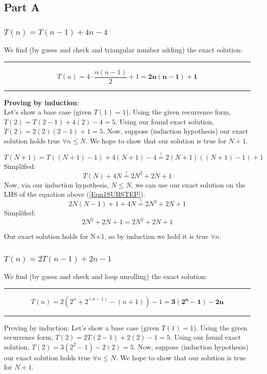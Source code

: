 \documentclass[conference]{styles/acmsiggraph}
\newcommand{\?}{\stackrel{?}{=}}
\begin{document}
\subsection{Part A}
\subsubsection{$T(n)=T(n-1)+4n-4$}
We find (by guess and check and triangular number adding) the exact solution: \\
\rule{\textwidth}{0.4pt}
$$T(n) = 4 \cdot \frac{n(n-1)}{2}+1 = \mathbf{2n(n-1)+1}$$
\rule{\textwidth}{0.4pt}
\textbf{Proving by induction}: \\

Let's show a base case (given $T(1) = 1$).  Using the given recurrence form, $T(2) = T(2-1) + 4(2) - 4 = 5$.  Using our found exact solution, $T(2) = 2(2)(2-1) + 1 = 5$.  Now, suppose (induction hypothesis) our exact solution holds true $\forall n \leq N$.  We hope to show that our solution is true for $N+1$.

\begin{equation}
    T(N+1) = T((N+1) - 1) + 4(N+1) - 4 \? 2(N+1)((N+1)-1) + 1
\end{equation}
Simplified:
\begin{equation} \label{Eqn1SUBSTEP}
    T(N) + 4N \? 2N^2 + 2N + 1
\end{equation}
Now, via our induction hypothesis,  $N \leq N$, we can use our exact solution on the LHS of the equation above (\ref{Eqn1SUBSTEP}).
\begin{equation}
    2N(N-1)+1 + 4N \? 2N^2 + 2N + 1
\end{equation}
Simplified:
\begin{equation}
    2N^2 + 2N + 1 = 2N^2 + 2N + 1
\end{equation}

Our exact solution holds for N+1, so by induction we hold it is true $\forall n$. \\





\subsubsection{$T(n)=2T(n-1)+2n-1$}
We find (by guess and check and loop unrolling) the exact solution: \\
\rule{\textwidth}{0.4pt}
$$T(n) = 2(2^{n}+2^{(n-1)}-(n+1))-1 = \mathbf{3(2^{n}-1)-2n}$$
\rule{\textwidth}{0.4pt}
Proving by induction:
Let's show a base case (given $T(1) = 1$).  Using the given recurrence form, $T(2) = 2T(2-1)+2(2)-1 = 5$.  Using our found exact solution, $T(2) = 3(2^{2}-1)-2(2) = 5$.  Now, suppose (induction hypothesis) our exact solution holds true $\forall n \leq N$.  We hope to show that our solution is true for $N+1$.
\end{document}
